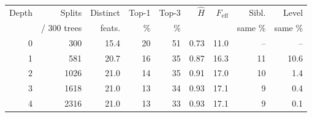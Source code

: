 \begin{tabular}{rrrrrrrrr}
\toprule
Depth & Splits & Distinct & Top-1 & Top-3 & $\hat{H}$ & $F_{\mathrm{eff}}$ & Sibl. & Level \\
 & / 300 trees & feats. & \% & \% & & & same \% & same \% \\
\midrule
0 & 300 & 15.4 & 20 & 51 & 0.73 & 11.0 & -- & -- \\
1 & 581 & 20.7 & 16 & 35 & 0.87 & 16.3 & 11 & 10.6 \\
2 & 1026 & 21.0 & 14 & 35 & 0.91 & 17.0 & 10 & 1.4 \\
3 & 1618 & 21.0 & 13 & 34 & 0.93 & 17.1 & 9 & 0.4 \\
4 & 2316 & 21.0 & 13 & 33 & 0.93 & 17.1 & 9 & 0.1 \\
\bottomrule
\end{tabular}
